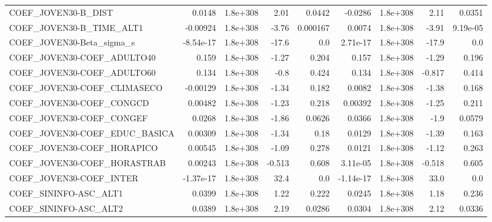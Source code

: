 \begin{tabular}{lrrrrrrrr}
COEF\_JOVEN30-B\_DIST               &      0.0148 &     1.8e+308 &      2.01 &   0.0442 &    -0.0286 &    1.8e+308 &         2.11 &        0.0351 \\
COEF\_JOVEN30-B\_TIME\_ALT1          &    -0.00924 &     1.8e+308 &     -3.76 & 0.000167 &     0.0074 &    1.8e+308 &        -3.91 &      9.19e-05 \\
COEF\_JOVEN30-Beta\_sigma\_s         &   -8.54e-17 &     1.8e+308 &     -17.6 &      0.0 &   2.71e-17 &    1.8e+308 &        -17.9 &           0.0 \\
COEF\_JOVEN30-COEF\_ADULTO40        &       0.159 &     1.8e+308 &     -1.27 &    0.204 &      0.157 &    1.8e+308 &        -1.29 &         0.196 \\
COEF\_JOVEN30-COEF\_ADULTO60        &       0.134 &     1.8e+308 &      -0.8 &    0.424 &      0.134 &    1.8e+308 &       -0.817 &         0.414 \\
COEF\_JOVEN30-COEF\_CLIMASECO       &    -0.00129 &     1.8e+308 &     -1.34 &    0.182 &     0.0082 &    1.8e+308 &        -1.38 &         0.168 \\
COEF\_JOVEN30-COEF\_CONGCD          &     0.00482 &     1.8e+308 &     -1.23 &    0.218 &    0.00392 &    1.8e+308 &        -1.25 &         0.211 \\
COEF\_JOVEN30-COEF\_CONGEF          &      0.0268 &     1.8e+308 &     -1.86 &   0.0626 &     0.0366 &    1.8e+308 &         -1.9 &        0.0579 \\
COEF\_JOVEN30-COEF\_EDUC\_BASICA     &     0.00309 &     1.8e+308 &     -1.34 &     0.18 &     0.0129 &    1.8e+308 &        -1.39 &         0.163 \\
COEF\_JOVEN30-COEF\_HORAPICO        &     0.00545 &     1.8e+308 &     -1.09 &    0.278 &     0.0121 &    1.8e+308 &        -1.12 &         0.263 \\
COEF\_JOVEN30-COEF\_HORASTRAB       &     0.00243 &     1.8e+308 &    -0.513 &    0.608 &   3.11e-05 &    1.8e+308 &       -0.518 &         0.605 \\
COEF\_JOVEN30-COEF\_INTER           &   -1.37e-17 &     1.8e+308 &      32.4 &      0.0 &  -1.14e-17 &    1.8e+308 &         33.0 &           0.0 \\
COEF\_SININFO-ASC\_ALT1             &      0.0399 &     1.8e+308 &      1.22 &    0.222 &     0.0245 &    1.8e+308 &         1.18 &         0.236 \\
COEF\_SININFO-ASC\_ALT2             &      0.0389 &     1.8e+308 &      2.19 &   0.0286 &     0.0304 &    1.8e+308 &         2.12 &        0.0336 \\

\end{tabular}
